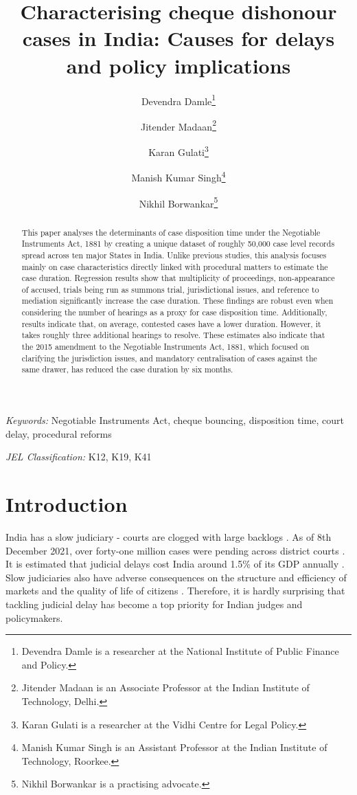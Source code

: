 \documentclass[12pt,a4paper]{article}
\title{Characterising cheque dishonour cases in India: Causes for delays and policy implications}
\author{Devendra Damle\thanks{Devendra Damle is a researcher at the National Institute of Public Finance and Policy.} \and Jitender Madaan\thanks{Jitender Madaan is an Associate Professor at the Indian Institute of Technology, Delhi.} \and Karan Gulati\thanks{Karan Gulati is a researcher at the Vidhi Centre for Legal Policy.} \and Manish Kumar Singh\thanks{Manish Kumar Singh is an Assistant Professor at the Indian Institute of Technology, Roorkee.} \and Nikhil Borwankar\thanks{Nikhil Borwankar is a practising advocate.}}
\begin{document}
\maketitle

\begin{abstract}

This paper analyses the determinants of case disposition time under the Negotiable Instruments Act, 1881 by creating a unique dataset of roughly 50,000 case level records spread across ten major States in India. Unlike previous studies, this analysis focuses mainly on case characteristics directly linked with procedural matters to estimate the case duration. Regression results show that multiplicity of proceedings, non-appearance of accused, trials being run as summons trial, jurisdictional issues, and reference to mediation significantly increase the case duration. These findings are robust even when considering the number of hearings as a proxy for case disposition time. Additionally, results indicate that, on average, contested cases have a lower duration. However, it takes roughly three additional hearings to resolve. These estimates also indicate that the 2015 amendment to the Negotiable Instruments Act, 1881, which focused on clarifying the jurisdiction issues, and mandatory centralisation of cases against the same drawer, has reduced the case duration by six months.

\end{abstract}

\textit{Keywords: } Negotiable Instruments Act, cheque bouncing, disposition time, court delay, procedural reforms

\textit{JEL Classification:} K12, K19, K41

\newpage
\tableofcontents

\newpage
\section{Introduction}
\label{sec:introduction}

India has a slow judiciary - courts are clogged with large backlogs \autocite{moog1992delays, debroy2008justice, dutta2019modernise}. As of 8th December 2021, over forty-one million cases were pending across district courts \autocite{njdg2021}. It is estimated that judicial delays cost India around 1.5\% of its GDP annually \autocite{dey2016_cost}. Slow judiciaries also have adverse consequences on the structure and efficiency of markets and the quality of life of citizens \autocite{world2004world, chemin2007impact, rao2020institutional}. Therefore, it is hardly surprising that tackling judicial delay has become a top priority for Indian judges and policymakers.
\end{document}

